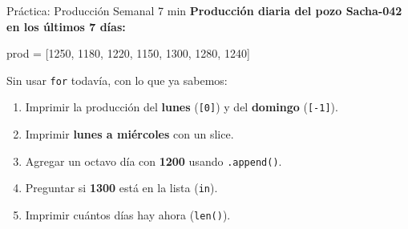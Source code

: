 \documentclass[aspectratio=169, 11pt]{beamer}
\begin{document}
\begin{frame}[fragile,shrink=6]{Práctica: Producción Semanal \hfill {\normalsize\color{arcaRed}\faClock\hspace{4pt}7 min}}
  \vspace{-4pt}
  {\small\color{arcaDark}\bfseries
    Producción diaria del pozo Sacha-042 en los últimos 7 días:}

  \vspace{3pt}
  \begin{pyblock}
prod = [1250, 1180, 1220, 1150, 1300, 1280, 1240]
  \end{pyblock}

  \vspace{3pt}
  {\footnotesize\color{textMuted}Sin usar \texttt{for} todavía, con lo que ya sabemos:}

  \vspace{2pt}
  {\footnotesize
  \begin{enumerate}\setlength{\itemsep}{2pt}
    \item[{\color{arcaRed}\bfseries 1.}]
      Imprimir la producción del \textbf{lunes} (\texttt{[0]}) y del \textbf{domingo} (\texttt{[-1]}).
    \item[{\color{arcaRed}\bfseries 2.}]
      Imprimir \textbf{lunes a miércoles} con un slice.
    \item[{\color{arcaRed}\bfseries 3.}]
      Agregar un octavo día con \textbf{1200} usando \texttt{.append()}.
    \item[{\color{arcaRed}\bfseries 4.}]
      Preguntar si \textbf{1300} está en la lista (\texttt{in}).
    \item[{\color{arcaRed}\bfseries 5.}]
      Imprimir cuántos días hay ahora (\texttt{len()}).
  \end{enumerate}
  }
\end{frame}
\end{document}
